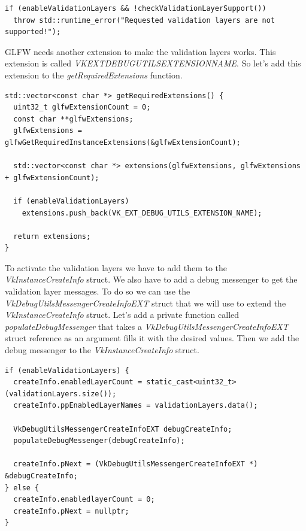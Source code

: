 \documentclass[12pt]{report} \usepackage{preamble}
\begin{document}
\newpage

\begin{lstlisting}[Language=C++]
if (enableValidationLayers && !checkValidationLayerSupport())
  throw std::runtime_error("Requested validation layers are not supported!");
\end{lstlisting}

\ac{GLFW} needs another extension to make the validation layers works. This extension is called
\textit{VK\textunderscore EXT\textunderscore DEBUG\textunderscore UTILS\textunderscore EXTENSION\textunderscore NAME}.
So let's add this extension to the \textit{getRequiredExtensions} function.

\begin{lstlisting}[Language=C++]
std::vector<const char *> getRequiredExtensions() {
  uint32_t glfwExtensionCount = 0;
  const char **glfwExtensions;
  glfwExtensions = glfwGetRequiredInstanceExtensions(&glfwExtensionCount);

  std::vector<const char *> extensions(glfwExtensions, glfwExtensions + glfwExtensionCount);

  if (enableValidationLayers)
    extensions.push_back(VK_EXT_DEBUG_UTILS_EXTENSION_NAME);

  return extensions;
}
\end{lstlisting}

To activate the validation layers we have to add them to the \textit{VkInstanceCreateInfo} struct.
We also have to add a debug messenger to get the validation layer messages. To do so we can
use the \textit{VkDebugUtilsMessengerCreateInfoEXT} struct that we will use to extend the
\textit{VkInstanceCreateInfo} struct. Let's add a private function called \textit{populateDebugMessenger}
that takes a \textit{VkDebugUtilsMessengerCreateInfoEXT} struct reference as an argument fills it with
the desired values. Then we add the debug messenger to the \textit{VkInstanceCreateInfo} struct.

\newpage

\begin{lstlisting}[Language=C++]
if (enableValidationLayers) {
  createInfo.enabledLayerCount = static_cast<uint32_t>(validationLayers.size());
  createInfo.ppEnabledLayerNames = validationLayers.data();

  VkDebugUtilsMessengerCreateInfoEXT debugCreateInfo;
  populateDebugMessenger(debugCreateInfo);

  createInfo.pNext = (VkDebugUtilsMessengerCreateInfoEXT *) &debugCreateInfo;
} else {
  createInfo.enabledlayerCount = 0;
  createInfo.pNext = nullptr;
}
\end{lstlisting}
\end{document}
